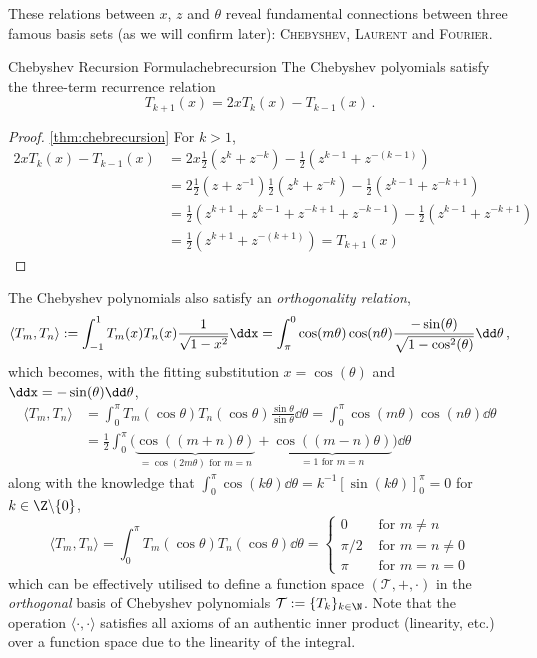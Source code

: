 \documentclass[12pt, a4paper]{article}
\begin{document}
  These relations between $x$, $z$ and $\theta$ reveal fundamental connections between three famous basis sets (as we will confirm later): \textsc{Chebyshev}, \textsc{Laurent} and \textsc{Fourier}.

  \begin{theorem}{Chebyshev Recursion Formula}{chebrecursion}
    The Chebyshev polyomials satisfy the three-term recurrence relation $$T_{k+1}(x) = 2x T_k(x) - T_{k-1}(x) \,.$$
  \end{theorem}
  \begin{proof}{\autoref{thm:chebrecursion}}
    For $k > 1$,
    \begin{align*}
      2x T_k(x) - T_{k-1}(x) & = 2x \frac{1}{2} (z^k + z^{-k}) - \frac{1}{2} (z^{k-1} + z^{-(k-1)})                       \\
                             & = 2 \frac{1}{2}(z + z^{-1}) \frac{1}{2}(z^k + z^{-k}) - \frac{1}{2} (z^{k-1} + z^{-k+1})   \\
                             & = \frac{1}{2} (z^{k+1} + z^{k-1} + z^{-k+1} + z^{-k-1}) - \frac{1}{2} (z^{k-1} + z^{-k+1}) \\
                             & = \frac{1}{2} (z^{k+1} + z^{-(k+1)}) = T_{k+1}(x)
    \end{align*}
  \end{proof}

  The Chebyshev polynomials also satisfy an \emph{orthogonality relation},
  $$\langle T_m, T_n \rangle := \int_{-1}^1 T_m(x) T_n(x) \frac{1}{\sqrt{1-x^2}} \ddx = \int_{\pi}^{0} \cos(m \theta) \cos(n \theta) \frac{-\sin(\theta)}{\sqrt{1-\cos^2(\theta)}} \dd\theta \,,$$
  which becomes, with the fitting substitution $x = \cos(\theta)$ and $\ddx = -\sin(\theta) \dd\theta$,
  \begin{align*}
    \langle T_m, T_n \rangle & = \int_0^\pi T_m(\cos \theta) T_n(\cos \theta) \frac{\sin \theta}{\sin \theta}\dd\theta = \int_0^\pi \cos(m \theta) \cos(n \theta) \dd\theta                            \\
                             & = \frac{1}{2} \int_0^\pi \big(\underbrace{\cos((m+n) \theta)}_{=\cos(2m\theta) \text{ for } m=n} + \underbrace{\cos((m-n) \theta)}_{=1 \text{ for } m=n}\big) \dd\theta
  \end{align*}
  along with the knowledge that $\int_0^\pi \cos(k \theta) \dd\theta = k^{-1} \left[\sin(k\theta)\right]_0^\pi = 0$ for $k \in \Z \backslash \{0\}$,
  $$\langle T_m, T_n \rangle = \int_0^\pi T_m(\cos \theta) T_n(\cos \theta) \dd\theta = \begin{cases}
      0     & \text{ for } m \neq n     \\
      \pi/2 & \text{ for } m = n \neq 0 \\
      \pi   & \text{ for } m = n = 0
    \end{cases}$$
  which can be effectively utilised to define a function space $(\mathcal{T}, +, \cdot)$ in the \emph{orthogonal} basis of Chebyshev polynomials $\mathcal{T} := \{T_k\}_{k \in \N}$.
  Note that the operation $\langle \cdot, \cdot \rangle$ satisfies all axioms of an authentic inner product (linearity, etc.) over a function space due to the linearity of the integral.
\end{document}

